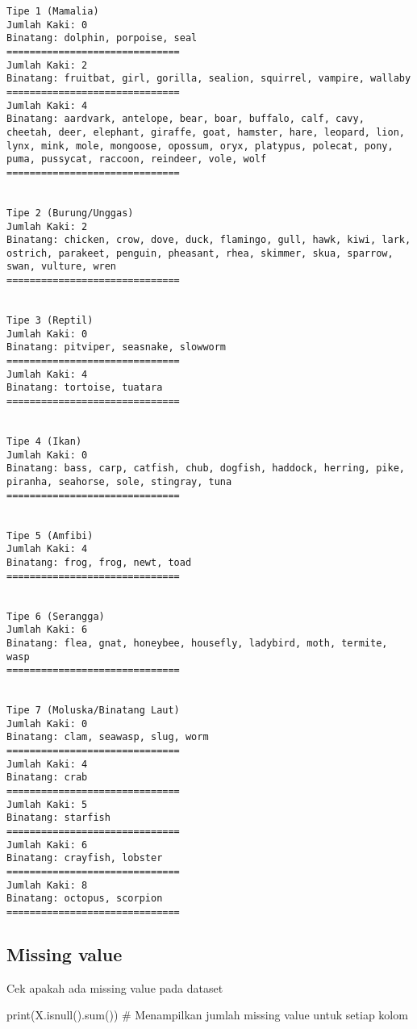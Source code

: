 \documentclass[
  letterpaper,
]{krantz}
\makeatletter
\newenvironment{Shaded}{\begin{snugshade}}{\end{snugshade}}
\newcommand{\BuiltInTok}[1]{\textcolor[rgb]{0.00,0.23,0.31}{#1}}
\newcommand{\CommentTok}[1]{\textcolor[rgb]{0.37,0.37,0.37}{#1}}
\newcommand{\NormalTok}[1]{\textcolor[rgb]{0.00,0.23,0.31}{#1}}
\newenvironment{kframe}{%
\medskip{}
\setlength{\fboxsep}{.8em}
 \def\at@end@of@kframe{}%
 \ifinner\ifhmode%
  \def\at@end@of@kframe{\end{minipage}}%
  \begin{minipage}{\columnwidth}%
 \fi\fi%
 \def\FrameCommand##1{\hskip\@totalleftmargin \hskip-\fboxsep
 \colorbox{shadecolor}{##1}\hskip-\fboxsep
     \hskip-\linewidth \hskip-\@totalleftmargin \hskip\columnwidth}%
 \MakeFramed {\advance\hsize-\width
   \@totalleftmargin\z@ \linewidth\hsize
   \@setminipage}}%
 {\par\unskip\endMakeFramed%
 \at@end@of@kframe}
\renewenvironment{Shaded}{\begin{kframe}}{\end{kframe}}
\makeatother
\begin{document}
\begin{verbatim}
Tipe 1 (Mamalia)
Jumlah Kaki: 0
Binatang: dolphin, porpoise, seal
==============================
Jumlah Kaki: 2
Binatang: fruitbat, girl, gorilla, sealion, squirrel, vampire, wallaby
==============================
Jumlah Kaki: 4
Binatang: aardvark, antelope, bear, boar, buffalo, calf, cavy, cheetah, deer, elephant, giraffe, goat, hamster, hare, leopard, lion, lynx, mink, mole, mongoose, opossum, oryx, platypus, polecat, pony, puma, pussycat, raccoon, reindeer, vole, wolf
==============================


Tipe 2 (Burung/Unggas)
Jumlah Kaki: 2
Binatang: chicken, crow, dove, duck, flamingo, gull, hawk, kiwi, lark, ostrich, parakeet, penguin, pheasant, rhea, skimmer, skua, sparrow, swan, vulture, wren
==============================


Tipe 3 (Reptil)
Jumlah Kaki: 0
Binatang: pitviper, seasnake, slowworm
==============================
Jumlah Kaki: 4
Binatang: tortoise, tuatara
==============================


Tipe 4 (Ikan)
Jumlah Kaki: 0
Binatang: bass, carp, catfish, chub, dogfish, haddock, herring, pike, piranha, seahorse, sole, stingray, tuna
==============================


Tipe 5 (Amfibi)
Jumlah Kaki: 4
Binatang: frog, frog, newt, toad
==============================


Tipe 6 (Serangga)
Jumlah Kaki: 6
Binatang: flea, gnat, honeybee, housefly, ladybird, moth, termite, wasp
==============================


Tipe 7 (Moluska/Binatang Laut)
Jumlah Kaki: 0
Binatang: clam, seawasp, slug, worm
==============================
Jumlah Kaki: 4
Binatang: crab
==============================
Jumlah Kaki: 5
Binatang: starfish
==============================
Jumlah Kaki: 6
Binatang: crayfish, lobster
==============================
Jumlah Kaki: 8
Binatang: octopus, scorpion
==============================

\end{verbatim}

\hypertarget{missing-value}{%
\subsection{Missing value}\label{missing-value}}

Cek apakah ada missing value pada dataset

\begin{Shaded}
\begin{Highlighting}[]
\BuiltInTok{print}\NormalTok{(X.isnull().}\BuiltInTok{sum}\NormalTok{())  }\CommentTok{\# Menampilkan jumlah missing value untuk setiap kolom}
\end{Highlighting}
\end{Shaded}
\end{document}
